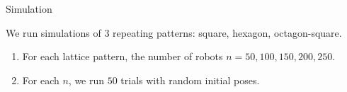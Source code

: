 \begin{frame}{Simulation}
  \small{We run simulations of $3$ repeating patterns: square, hexagon, octagon-square.
    \begin{enumerate}
    \item For each lattice pattern, the number of robots $n=50,100,150,200,250$.
    \item For each $n$, we run $50$ trials with random initial poses.
    \end{enumerate}
  }
\end{frame}
